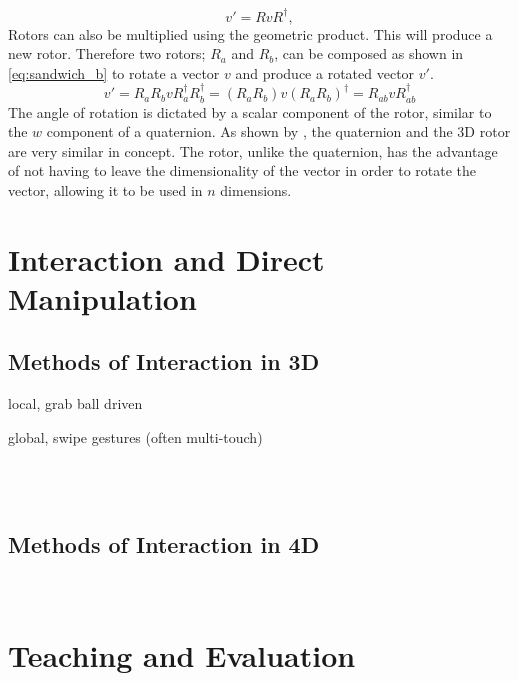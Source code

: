 \documentclass{l4proj}
\begin{document}
%
\begin{equation}
  \label{eq:sandwich_a}
    v' = R v R^\dagger,
\end{equation}
%
Rotors can also be multiplied using the geometric product. This will produce a new rotor. Therefore two rotors; $R_a$ and $R_b$, can be composed as shown in \cref{eq:sandwich_b} to rotate a vector \(v\) and produce a rotated vector \(v'\).
%
\begin{equation}
  \label{eq:sandwich_b}
  v' = R_a R_b v R_a^{\dagger} R_b^{\dagger}
   = (R_a R_b) v (R_a R_b)^{\dagger}
   = R_{ab}^{} v R_{ab}^{\dagger}
\end{equation}
%
The angle of rotation is dictated by a scalar component of the rotor, similar to the \(w\) component of a quaternion. 
As shown by \citep{bosch_code_nodate}, the quaternion and the 3D rotor are very similar in concept. The rotor, unlike the quaternion, has the advantage of not having to leave the dimensionality of the vector in order to rotate the vector, allowing it to be used in \(n\) dimensions.

\section{Interaction and Direct Manipulation}

\subsection{Methods of Interaction in 3D}

local, grab ball driven

global, swipe gestures (often multi-touch)

\citep{shoemake_arcball_1994}\\
\citep{hinckley_usability_1997}\\
\citep{balakrishnan_rockinmouse_1997}

\subsection{Methods of Interaction in 4D}

\citep{murata_interactive_2000}\\
\citep{kageyama_keyboard-based_2005}

\section{Teaching and Evaluation}
\end{document}
